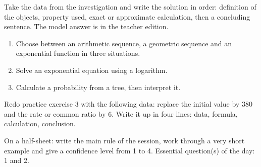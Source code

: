 \begin{exemple}
Take the data from the investigation and write the solution in order: definition of the objects, property used, exact or approximate calculation, then a concluding sentence. The model answer is in the teacher edition.
\end{exemple}

\begin{exercice}[-- essentiel]
\begin{enumerate}\item Choose between an arithmetic sequence, a geometric sequence and an exponential function in three situations.\item Solve an exponential equation using a logarithm.\item Calculate a probability from a tree, then interpret it.\end{enumerate}
\end{exercice}


\begin{dm}Redo practice exercise 3 with the following data: replace the initial value by $380$ and the rate or common ratio by $6$. Write it up in four lines: data, formula, calculation, conclusion.\end{dm}

\begin{sortie}On a half-sheet: write the main rule of the session, work through a very short example and give a confidence level from 1 to 4. Essential question(s) of the day: 1 and 2.\end{sortie}

